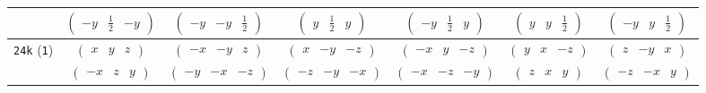 \documentclass[fleqn,9pt,landscape]{jsarticle}
\begin{document}
\begin{center}
\begin{longtable}{ccccccc}
& $ \begin{pmatrix} - y & \frac{1}{2} & - y \end{pmatrix} $ & $ \begin{pmatrix} - y & - y & \frac{1}{2} \end{pmatrix} $ & $ \begin{pmatrix} y & \frac{1}{2} & y \end{pmatrix} $ & $ \begin{pmatrix} - y & \frac{1}{2} & y \end{pmatrix} $ & $ \begin{pmatrix} y & y & \frac{1}{2} \end{pmatrix} $ & $ \begin{pmatrix} - y & y & \frac{1}{2} \end{pmatrix} $ \\ \hline
{\tt 24k} ({\tt 1}) & $ \begin{pmatrix} x & y & z \end{pmatrix} $ & $ \begin{pmatrix} - x & - y & z \end{pmatrix} $ & $ \begin{pmatrix} x & - y & - z \end{pmatrix} $ & $ \begin{pmatrix} - x & y & - z \end{pmatrix} $ & $ \begin{pmatrix} y & x & - z \end{pmatrix} $ & $ \begin{pmatrix} z & - y & x \end{pmatrix} $ \\
& $ \begin{pmatrix} - x & z & y \end{pmatrix} $ & $ \begin{pmatrix} - y & - x & - z \end{pmatrix} $ & $ \begin{pmatrix} - z & - y & - x \end{pmatrix} $ & $ \begin{pmatrix} - x & - z & - y \end{pmatrix} $ & $ \begin{pmatrix} z & x & y \end{pmatrix} $ & $ \begin{pmatrix} - z & - x & y \end{pmatrix} $ \\

\end{longtable}
\end{center}
\end{document}
